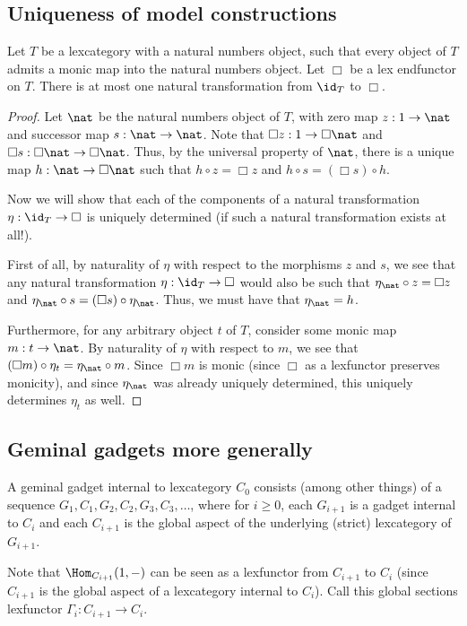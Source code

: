 \subsection{Uniqueness of model constructions}
\begin{lemma}
Let $T$ be a lexcategory with a natural numbers object, such that every object of $T$ admits a monic map into the natural numbers object. Let $\Box$ be a lex endfunctor on $T$. There is at most one natural transformation from $\id_T$ to $\Box$.
\end{lemma}
\begin{proof}
Let $\nat$ be the natural numbers object of $T$, with zero map $z : 1 \to \nat$ and successor map $s : \nat \to \nat$. Note that $\Box z : 1 \to \Box \nat$ and $\Box s : \Box \nat \to \Box \nat$. Thus, by the universal property of $\nat$, there is a unique map $h : \nat \to \Box \nat$ such that $h \circ z = \Box z$ and $h \circ s = (\Box s) \circ h$.

Now we will show that each of the components of a natural transformation $\eta : \id_T \to \Box$ is uniquely determined (if such a natural transformation exists at all!).

First of all, by naturality of $\eta$ with respect to the morphisms $z$ and $s$, we see that any natural transformation $\eta : \id_T \to \Box$ would also be such that $\eta_{\nat} \circ z = \Box z$ and $\eta_{\nat} \circ s = (\Box s) \circ \eta_{\nat}$. Thus, we must have that $\eta_{\nat} = h$.

Furthermore, for any arbitrary object $t$ of $T$, consider some monic map $m : t \to \nat$. By naturality of $\eta$ with respect to $m$, we see that $(\Box m) \circ \eta_t = \eta_{\nat} \circ m$. Since $\Box m$ is monic (since $\Box$ as a lexfunctor preserves monicity), and since $\eta_{\nat}$ was already uniquely determined, this uniquely determines $\eta_t$ as well.
\end{proof}

\subsection{Geminal gadgets more generally}
A geminal gadget internal to lexcategory $C_0$ consists (among other things) of a sequence $G_1, C_1, G_2, C_2, G_3, C_3, \ldots$, where for $i \geq 0$, each $G_{i + 1}$ is a gadget internal to $C_i$ and each $C_{i + 1}$ is the global aspect of the underlying (strict) lexcategory of $G_{i + 1}$.

Note that $\Hom_{C_{i + 1}}(1, -)$ can be seen as a lexfunctor from $C_{i + 1}$ to $C_i$ (since $C_{i + 1}$ is the global aspect of a lexcategory internal to $C_i$). Call this global sections lexfunctor $\Gamma_i : C_{i + 1} \to C_i$.

